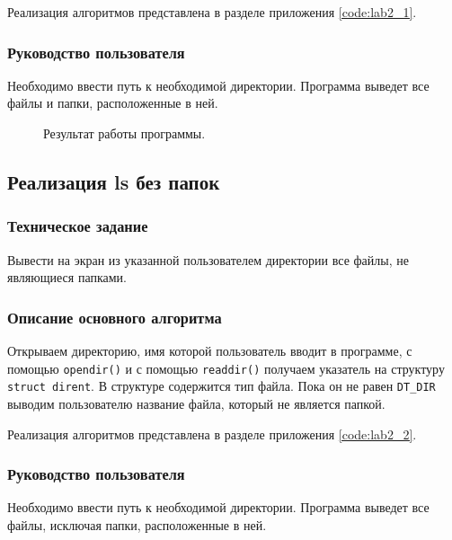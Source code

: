 \documentclass[a4paper,14pt]{extarticle}
\begin{document}
Реализация алгоритмов представлена в разделе приложения \ref{code:lab2_1}.

\subsubsection{Руководство пользователя}
Необходимо ввести путь к необходимой директории. Программа выведет все файлы и папки, расположенные в ней.

\begin{figure}[h]
\caption{Результат работы программы.}
\label{1.png}
\end{figure}

\subsection{Реализация ls без папок}
\subsubsection{Техническое задание}
Вывести на экран из указанной пользователем директории все файлы, не являющиеся папками.

\subsubsection{Описание основного алгоритма}
Открываем директорию, имя которой пользователь вводит в программе, с помощью \verb|opendir()| и с помощью \verb|readdir()| получаем указатель на структуру \verb|struct dirent|. В структуре содержится тип файла. Пока он не равен \verb|DT_DIR| выводим пользователю название файла, который не является папкой.

Реализация алгоритмов представлена в разделе приложения \ref{code:lab2_2}.

\subsubsection{Руководство пользователя}
Необходимо ввести путь к необходимой директории. Программа выведет все файлы, исключая папки, расположенные в ней.
\end{document}

